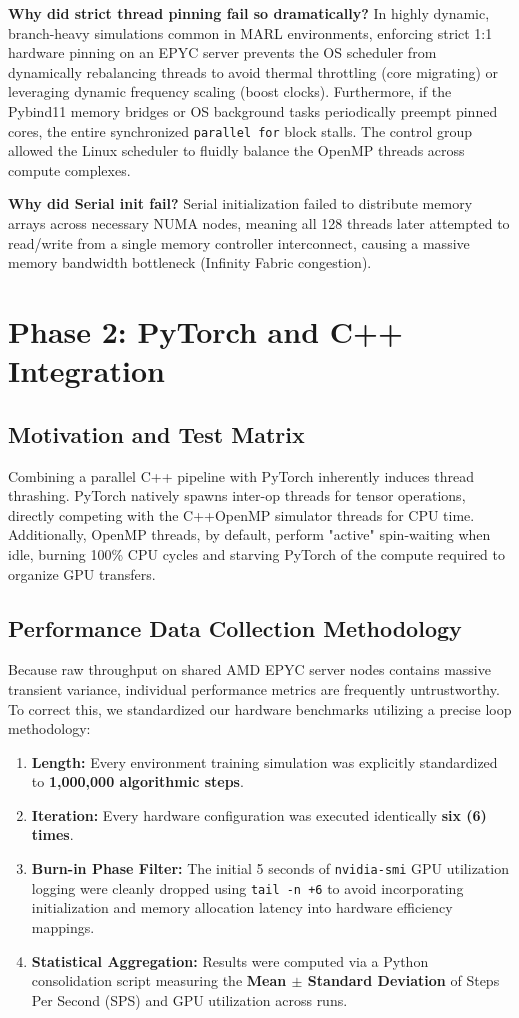 \documentclass[11pt,a4paper]{article}
\begin{document}
\textbf{Why did strict thread pinning fail so dramatically?} 
In highly dynamic, branch-heavy simulations common in MARL environments, enforcing strict 1:1 hardware pinning on an EPYC server prevents the OS scheduler from dynamically rebalancing threads to avoid thermal throttling (core migrating) or leveraging dynamic frequency scaling (boost clocks). Furthermore, if the Pybind11 memory bridges or OS background tasks periodically preempt pinned cores, the entire synchronized \texttt{parallel for} block stalls. The control group allowed the Linux scheduler to fluidly balance the OpenMP threads across compute complexes. 

\textbf{Why did Serial init fail?} 
Serial initialization failed to distribute memory arrays across necessary NUMA nodes, meaning all 128 threads later attempted to read/write from a single memory controller interconnect, causing a massive memory bandwidth bottleneck (Infinity Fabric congestion).

\section{Phase 2: PyTorch and C++ Integration}
\subsection{Motivation and Test Matrix}
Combining a parallel C++ pipeline with PyTorch inherently induces thread thrashing. PyTorch natively spawns inter-op threads for tensor operations, directly competing with the C++OpenMP simulator threads for CPU time. Additionally, OpenMP threads, by default, perform "active" spin-waiting when idle, burning 100\% CPU cycles and starving PyTorch of the compute required to organize GPU transfers.

\subsection{Performance Data Collection Methodology}
Because raw throughput on shared AMD EPYC server nodes contains massive transient variance, individual performance metrics are frequently untrustworthy. To correct this, we standardized our hardware benchmarks utilizing a precise loop methodology:
\begin{enumerate}
    \item \textbf{Length:} Every environment training simulation was explicitly standardized to \textbf{1,000,000 algorithmic steps}.
    \item \textbf{Iteration:} Every hardware configuration was executed identically \textbf{six (6) times}.
    \item \textbf{Burn-in Phase Filter:} The initial 5 seconds of \texttt{nvidia-smi} GPU utilization logging were cleanly dropped using \texttt{tail -n +6} to avoid incorporating initialization and memory allocation latency into hardware efficiency mappings. 
    \item \textbf{Statistical Aggregation:} Results were computed via a Python consolidation script measuring the \textbf{Mean $\pm$ Standard Deviation} of Steps Per Second (SPS) and GPU utilization across runs.
\end{enumerate}
\end{document}
